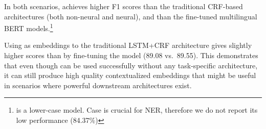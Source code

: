\begin{table}[ht]
    \centering \small
    \caption{\textbf{NER} scores on the FTB (best model selected on validation out of 4). Best scores in bold, second best underlined.
        \label{table:ner_ablation}}
\end{table}

In both scenarios, \camembert achieves higher F1 scores than the traditional CRF-based architectures (both non-neural and neural), and than the fine-tuned multilingual BERT models.\footnote{\xlmmlmtlm is a lower-case model. Case is crucial for NER, therefore we do not report its low performance (84.37\%)}

Using \camembert as embeddings to the traditional LSTM+CRF architecture gives slightly higher scores than by fine-tuning the model (89.08 vs.~89.55).
This demonstrates that even though \camembert can be used successfully without any task-specific architecture, it can still produce high quality contextualized embeddings that might be useful in scenarios where powerful downstream architectures exist.

